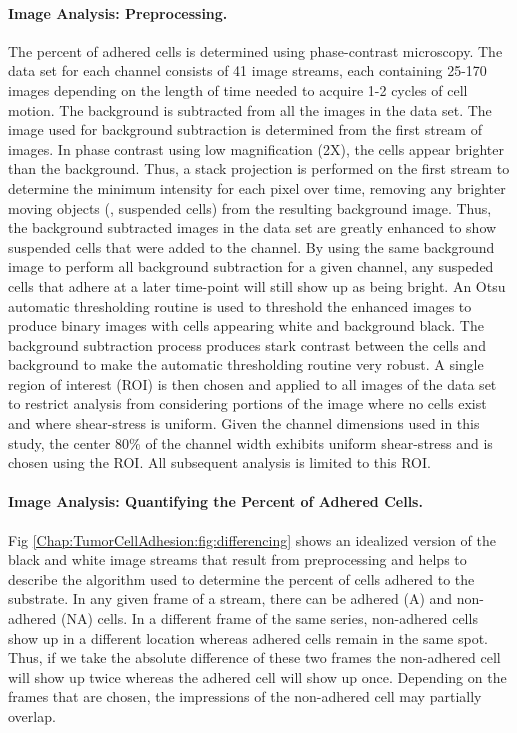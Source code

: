 \paragraph{Image Analysis: Preprocessing.}The percent of adhered cells is determined using phase-contrast microscopy. The data set for each channel consists of 41 image streams, each containing 25-170 images depending on the length of time needed to acquire 1-2 cycles of cell motion. The background is subtracted from all the images in the data set. The image used for background subtraction is determined from the first stream of images. In phase contrast using low magnification (2X), the cells appear brighter than the background. Thus, a stack projection is performed on the first stream to determine the minimum intensity for each pixel over time, removing any brighter moving objects (\ie, suspended cells) from the resulting background image. Thus, the background subtracted images in the data set are greatly enhanced to show suspended cells that were added to the channel. By using the same background image to perform all background subtraction for a given channel, any suspeded cells that adhere at a later time-point will still show up as being bright. An Otsu automatic thresholding routine is used to threshold the enhanced images to produce binary images with cells appearing white and background black. The background subtraction process produces stark contrast between the cells and background to make the automatic thresholding routine very robust. A single region of interest (ROI) is then chosen and applied to all images of the data set to restrict analysis from considering portions of the image where no cells exist and where shear-stress is uniform. Given the channel dimensions used in this study, the center 80\% of the channel width exhibits uniform shear-stress and is chosen using the ROI. All subsequent analysis is limited to this ROI.
 
\paragraph{Image Analysis: Quantifying the Percent of Adhered Cells.}Fig \ref{Chap:TumorCellAdhesion:fig:differencing} shows an idealized version of the black and white image streams that result from preprocessing and helps to describe the algorithm used to determine the percent of cells adhered to the substrate. In any given frame of a stream, there can be adhered (A) and non-adhered (NA) cells. In a different frame of the same series, non-adhered cells show up in a different location whereas adhered cells remain in the same spot. Thus, if we take the absolute difference of these two frames the non-adhered cell will show up twice whereas the adhered cell will show up once. Depending on the frames that are chosen, the impressions of the non-adhered cell may partially overlap.

